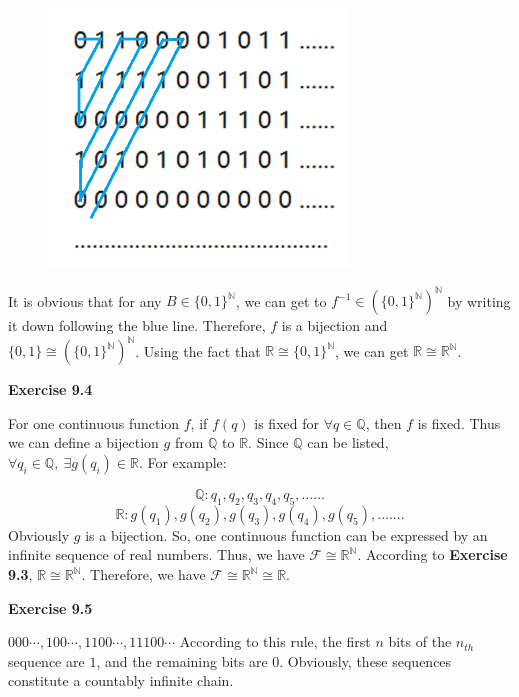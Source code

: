 \documentclass{article} %
\begin{document}
\begin{figure}[H]
    \centering
    \includegraphics[width=8cm]{9_3_1.png}
    \caption{}
    \label{}
    \end{figure}
It is obvious that for any $B\in \{0,1\}^\mathbb{N}$, we can get to $f^{-1}\in (\{0,1\}^\mathbb{N})^\mathbb{N}$ by writing it down following the blue line. Therefore, $f$ is a bijection and $\{0,1\}\cong (\{0,1\}^\mathbb{N})^\mathbb{N}$. Using the fact that $\mathbb{R}\cong \{0,1\}^\mathbb{N}$, we can get $\mathbb{R}\cong \mathbb{R}^\mathbb{N}$.\par


	\textbf{Exercise 9.4}\par
	For one continuous function $f$, if $f(q)$ is fixed for $\forall q\in \mathbb{Q}$, then $f$ is fixed.
	Thus we can define a bijection $g$ from $\mathbb{Q}$ to $\mathbb{R}$. Since $\mathbb{Q}$ can be listed, $\forall q_{i}\in \mathbb{Q},\  \exists g(q_{i})\in \mathbb{R}$.
	For example:\par
	$$
	\mathbb{Q}:q_1,q_2,q_3,q_4,q_5,......
	$$
	$$
	\mathbb{R}:g(q_1),g(q_2),g(q_3),g(q_4),g(q_5),.......
	$$
	Obviously $g$ is a bijection. So, one continuous function can be expressed by an infinite sequence of real numbers. 
	Thus, we have   $\mathcal{F} \cong \mathbb{R}^{\mathbb{N}}$. According to \textbf{Exercise 9.3},  $\mathbb{R} \cong \mathbb{R}^{\mathbb{N}}$.
	Therefore, we have $\mathcal{F} \cong \mathbb{R}^{\mathbb{N}} \cong \mathbb{R}$.\par

	\textbf{Exercise 9.5}\par
    $000\cdots,100\cdots,1100\cdots,11100\cdots$ According to this rule, the first $n$ bits of the $n_{th}$ sequence are $1$, and the remaining bits are $0$. Obviously, these sequences constitute a countably infinite chain.\par
	
\end{document}
